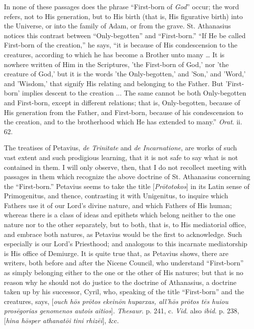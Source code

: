 In none of these passages does the phrase ``First-born of \emph{God}''
occur; the word refers, not to His generation, but to His birth (that
is, His figurative birth) into the Universe, or into the family of
Adam, or from the grave. St. Athanasius notices this contrast between
``Only-begotten'' and ``First-born.'' ``If He be
called First-born of the creation,'' he says, ``it is because
of His condescension to the creatures, according to which he has
become a Brother unto many … It is nowhere written of Him in the
Scriptures, 'the First-born of God,' nor 'the creature of God,' but it
is the words 'the Only-begotten,' and 'Son,' and 'Word,' and 'Wisdom,'
that signify His relating and belonging to the Father. But
'First-born' implies descent to the creation ... The same cannot
be both Only-begotten and First-born, except in different relations;
that is, Only-begotten, because of His generation from the Father, and
First-born, because of his condescension to the creation, and to the
brotherhood which He has extended to many.'' \emph{Orat}. ii. 62.

The treatises of Petavius, \emph{de Trinitate} and \emph{de
Incarnatione}, are works of such vast extent and such prodigious
learning, that it is not safe to say what is not contained in them. I
will only observe, then, that I do not recollect meeting with passages
in them which recognize the above doctrine of St. Athanasius
concerning the ``First-born.'' Petavius seems to take the
title [\emph{Pr\={o}totokos}] in its Latin sense of Primogenitus,
and thence, contrasting it with Unigenitus, to inquire which Fathers
use it of our Lord's divine nature, and which Fathers of His human;
whereas there is a class of ideas and epithets which belong neither to
the one nature nor to the other separately, but to both, that is, to
His mediatorial office, and embrace both natures, as Petavius would be
the first to acknowledge. Such especially is our Lord's Priesthood;
and analogous to this incarnate mediatorship is His office of
Demiurge. It is quite true that, as Petavius shows, there are writers,
both before and after the Nicene Council, who understand
``First-born'' as simply belonging either to the one or the
other of His natures; but that is no reason why he should not do
justice to the doctrine of Athanasius, a doctrine taken up by his
successor, Cyril, who, speaking of the title ``First-born''
and the creatures, says, [\emph{ouch h\={o}s pr\={o}tos ekein\={o}n
huparxas, all'}\emph{h\={o}s pr\={o}tos t\={e}s huiou pros\={e}gorias
genomenos autois aitios}]. \emph{Thesaur}. p. 241, c. \emph{Vid}.
also \emph{ibid}. p. 238, [\emph{hina h\={o}sper athanat\={o}i tini
rhiz\={e}i}], \&c.

